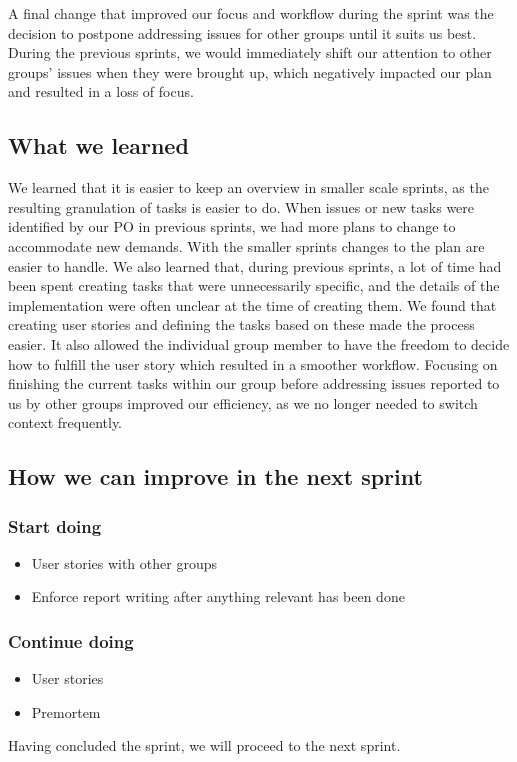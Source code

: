A final change that improved our focus and workflow during the sprint was the decision to postpone addressing issues for other groups until it suits us best. During the previous sprints, we would immediately shift our attention to other groups' issues when they were brought up, which negatively impacted our plan and resulted in a loss of focus.

\subsection{What we learned}
We learned that it is easier to keep an overview in smaller scale sprints, as the resulting granulation of tasks is easier to do. When issues or new tasks were identified by our PO in previous sprints, we had more plans to change to accommodate new demands. With the smaller sprints changes to the plan are easier to handle. 
We also learned that, during previous sprints, a lot of time had been spent creating tasks that were unnecessarily specific, and the details of the implementation were often unclear at the time of creating them. We found that creating user stories and defining the tasks based on these made the process easier. It also allowed the individual group member to have the freedom to decide how to fulfill the user story which resulted in a smoother workflow.  
Focusing on finishing the current tasks within our group before addressing issues reported to us by other groups improved our efficiency, as we no longer needed to switch context frequently.

\subsection{How we can improve in the next sprint}
\subsubsection{Start doing}
\begin{itemize}
    \item User stories with other groups
    \item Enforce report writing after anything relevant has been done
\end{itemize}
\subsubsection{Continue doing}
\begin{itemize}
    \item User stories
    \item Premortem
\end{itemize}

Having concluded the sprint, we will proceed to the next sprint.
